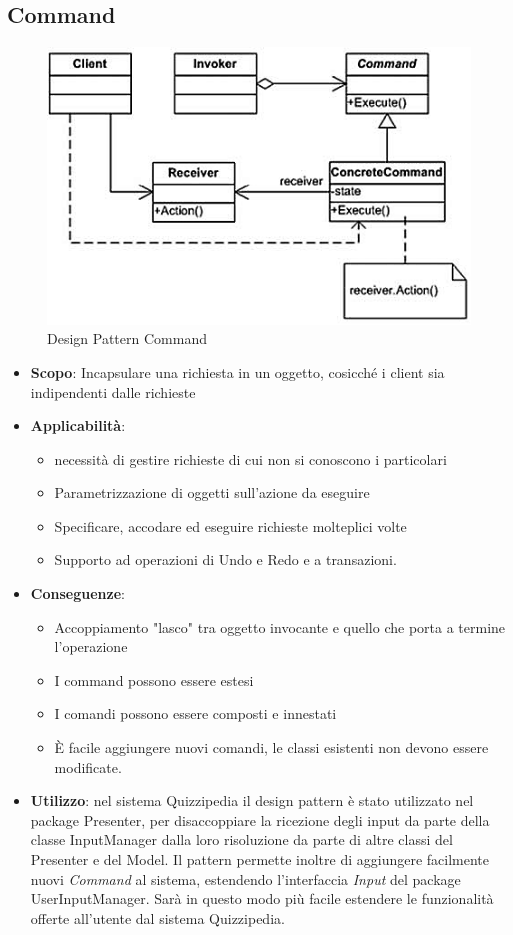 \documentclass[a4paper,11pt]{article}
\begin{document}
	\subsection{Command}
	\begin{figure}[h!]
	\begin{center}
		\includegraphics[scale=1]{../images/Command.png}
		\caption{Design Pattern Command}
	\end{center}
	\end{figure}
	\begin{itemize}
		\item\textbf{Scopo}: Incapsulare una richiesta in un oggetto, cosicché i
client sia indipendenti dalle richieste
		\item\textbf{Applicabilità}:
		\begin{itemize}
			\item necessità di gestire richieste di cui non si conoscono i
particolari
			\item Parametrizzazione di oggetti sull'azione da eseguire
			\item Specificare, accodare ed eseguire richieste molteplici
volte
			\item Supporto ad operazioni di Undo e Redo e a transazioni.
		\end{itemize}
		\item\textbf{Conseguenze}:
		\begin{itemize}
			\item Accoppiamento "lasco" tra oggetto invocante e
quello che porta a termine l'operazione
			\item I command possono essere estesi
			\item I comandi possono essere composti e innestati
			\item È facile aggiungere nuovi comandi, le classi esistenti non devono essere modificate.
		\end{itemize}
		\item\textbf{Utilizzo}: nel sistema Quizzipedia il design pattern è stato utilizzato nel package Presenter, per disaccoppiare la ricezione degli input da parte della classe InputManager dalla loro risoluzione da parte di altre classi del Presenter e del Model. Il pattern permette inoltre di aggiungere facilmente nuovi \emph{Command} al sistema, estendendo l'interfaccia \emph{Input} del package UserInputManager. Sarà in questo modo più facile estendere le funzionalità offerte all'utente dal sistema Quizzipedia.
	\end{itemize}
	\newpage
	
\end{document}
